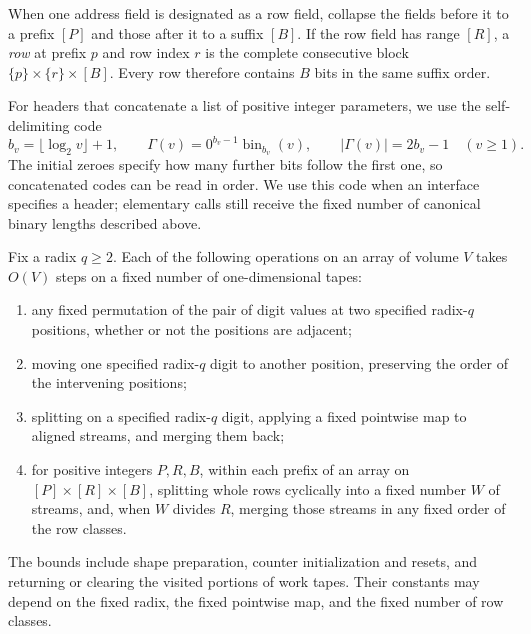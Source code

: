 When one address field is designated as a row field, collapse the fields
before it to a prefix $[P]$ and those after it to a suffix $[B]$.  If the
row field has range $[R]$, a \emph{row} at prefix $p$ and row index $r$
is the complete consecutive block $\{p\}\times\{r\}\times[B]$.
Every row therefore contains $B$ bits in the same suffix order.

For headers that concatenate a list of positive integer parameters, we use
the self-delimiting code
\begin{equation}
 b_v=\lfloor\log_2v\rfloor+1,\qquad
 \Gamma(v)=0^{b_v-1}\operatorname{bin}_{b_v}(v),\qquad
 |\Gamma(v)|=2b_v-1\quad(v\ge1).
 \label{eq:integer-descriptor-code}
\end{equation}
The initial zeroes specify how many further bits follow the first one,
so concatenated codes can be read in order. We use this code when an
interface specifies a header; elementary calls still receive the fixed
number of canonical binary lengths described above.

\begin{lemma}
\label{lem:elementary-streams}
Fix a radix $q\ge2$.  Each of the following operations on an array of
volume $V$ takes $O(V)$ steps on a fixed number of one-dimensional tapes:
\begin{enumerate}
\item any fixed permutation of the pair of digit values at two specified
radix-$q$ positions, whether or not the positions are adjacent;
\item moving one specified radix-$q$ digit to another position, preserving
the order of the intervening positions;
\item splitting on a specified radix-$q$ digit, applying a fixed
pointwise map to aligned streams, and merging them back;
\item for positive integers $P,R,B$, within each prefix of an array on
$[P]\times[R]\times[B]$, splitting
whole rows cyclically into a fixed number $W$ of streams, and, when $W$
divides $R$, merging those streams in any fixed order of the row classes.
\end{enumerate}
The bounds include shape preparation, counter initialization and resets,
and returning or clearing the visited portions of work tapes.  Their
constants may depend on the fixed radix, the fixed pointwise map, and the
fixed number of row classes.
\end{lemma}


